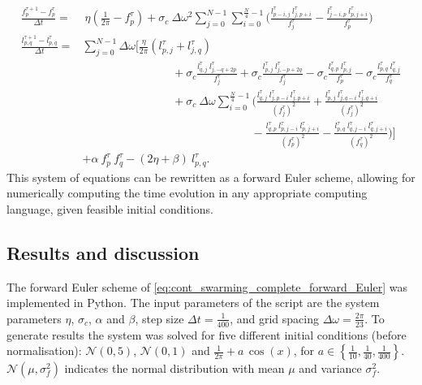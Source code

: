 \begin{subequations}\label{eq:cont_swarming_complete_forward_Euler}
	\begin{alignat}{2}
	\frac{f_{p}^{\tau +1} - f_{p}^{\tau }}{\Delta t} = & 
	\ \eta \left(\frac{1}{2\pi} - f_{p}^{\tau } \right) + 
	\sigma_c\ \Delta\omega^2 \sum\limits_{j=0}^{N-1}\sum\limits_{i=0}^{\frac{N}{4}-1}  
	\Bigg(
	\frac{l_{p-i,j}^{\tau }\  l_{j,p+i}^{\tau }}{f_{j}^{\tau }} - 
	\frac{l_{j-i,p}^{\tau }\ l_{p,j+i}^{\tau }}{f_{p}^{\tau }} 
	\Bigg)\\[15pt]
	\frac{l_{p,q}^{\tau +1} - l_{p,q}^{\tau }}{\Delta t} = & 
	\sum\limits_{j=0}^{N-1} \Delta \omega 
	\Bigg[
	\frac{\eta}{2\pi} \left( l_{p,j}^{\tau } + l_{j,q}^{\tau }\right) \\
	& \phantom{\sum\limits_{j=0}^{N-1} \Delta \omega\sum\limits_{j=0}^{N-1} } 
	+ \sigma_c \frac{l_{q,j}^{\tau}\ l_{j,-q+2p}^{ \tau}}{f_{j}^{\tau}}
	+ \sigma_c \frac{l_{p,j}^{\tau}\ l_{j,-p+2q}^{ \tau}}{f_{j}^{\tau}}
	- \sigma_c \frac{l_{q,p}^{\tau }\ l_{p,j}^{\tau }}{f_{p}^{\tau }} 
	- \sigma_c \frac{l_{p,q}^{\tau }\ l_{q,j}^{\tau }}{f_{q}^{\tau }} \nonumber  \\
	& \phantom{\sum\limits_{j=0}^{N-1} \Delta \omega\sum\limits_{j=0}^{N-1} } 
	+ \sigma_c\ \Delta \omega \sum\limits_{i=0}^{\frac{N}{4}-1}  
	\Bigg(
	\frac{l_{q,j}^{\tau }\ l_{j, p-i}^{\tau }\ l_{j, p+i}^{\tau }}{(f_{j}^{\tau })^2}
	+ \frac{l_{p,j}^{\tau }\ l_{j, q-i}^{\tau }\ l_{j, q+i}^{\tau }}{(f_{j}^{\tau })^2}	\nonumber \\
	& \phantom{\sum\limits_{j=0}^{N-1}\sum\limits_{j=0}^{N-1} \Delta \omega \sigma_c\sum\limits_{i=0}^{\frac{N}{4}-1} \Delta \omega\sum }
	- \frac{l_{q,p}^{\tau }\ l_{p, j-i}^{\tau }\ l_{p,j+i}^{\tau }}{(f_{p}^{\tau })^2}
	- \frac{l_{p,q}^{\tau }\ l_{q, j-i}^{\tau }\ l_{q,j+i}^{\tau }}{(f_{q}^{\tau })^2}
	\Bigg)
	\Bigg] \nonumber \\
	&+ \alpha\ f_{p}^{\tau }\ f_{q}^{\tau }
	- (2\eta+\beta)\ l_{p,q}^{\tau }.\nonumber
	\end{alignat}
\end{subequations}
This system of equations can be rewritten as a forward Euler scheme, allowing for numerically computing the time evolution in any appropriate computing language, given feasible initial conditions.



\subsection{Results and discussion}
The forward Euler scheme of \cref{eq:cont_swarming_complete_forward_Euler} was implemented in Python. The input parameters of the script are the system parameters $\eta$, $\sigma_c$, $\alpha$ and $\beta$, step size $\Delta t = \frac{1}{400}$, and grid spacing $\Delta \omega = \frac{2\pi}{23}$. To generate results the system was solved for five different initial conditions (before normalisation): $\mathcal{N}(0,5)$, $\mathcal{N}(0,1)$ and  $\frac{1}{2\pi}+a\, \cos(x)$, for $a\in\left\lbrace\frac{1}{10}, \frac{1}{40}, \frac{1}{400}\right\rbrace$.  $\mathcal{N}(\mu,\sigma_f^2)$ indicates the normal distribution with mean $\mu$ and variance $\sigma_f^2$.

